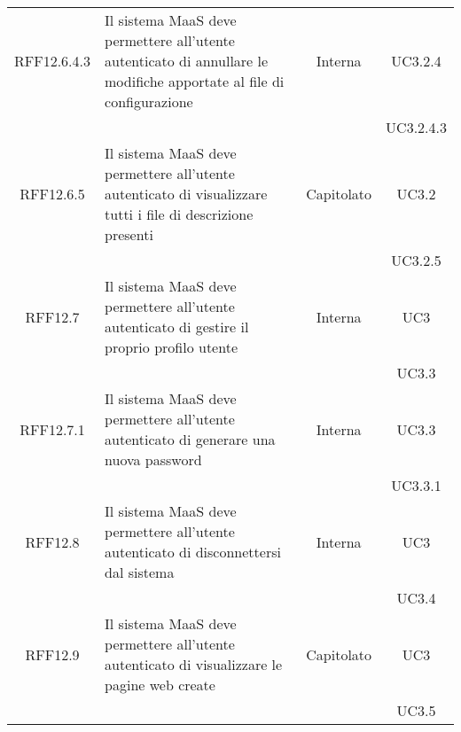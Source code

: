 \begin{longtable}{|c|p{6cm}|c|c|}
\midrule
RFF12.6.4.3
& Il sistema MaaS deve permettere all'utente autenticato di annullare le modifiche apportate al file di configurazione
& Interna
& UC3.2.4\\
& & & UC3.2.4.3\\

\midrule
RFF12.6.5
& Il sistema MaaS deve permettere all'utente autenticato di visualizzare tutti i file di descrizione presenti
& Capitolato
& UC3.2\\
& & & UC3.2.5\\

\midrule
RFF12.7
& Il sistema MaaS deve permettere all'utente autenticato di gestire il proprio profilo utente
& Interna
& UC3\\
& & & UC3.3\\

\midrule
RFF12.7.1
& Il sistema MaaS deve permettere all'utente autenticato di generare una nuova password
& Interna
& UC3.3\\
& & & UC3.3.1\\

\midrule
RFF12.8
& Il sistema MaaS deve permettere all'utente autenticato di disconnettersi dal sistema
& Interna
& UC3\\
& & & UC3.4\\

\midrule
RFF12.9
& Il sistema MaaS deve permettere all'utente autenticato di visualizzare le pagine web create
& Capitolato
& UC3\\
& & & UC3.5\\

\end{longtable}

\newpage
